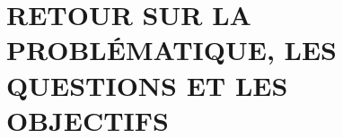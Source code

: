 
\label{chap:conclusion_generale}

\section{RETOUR SUR LA PROBL\'EMATIQUE, LES QUESTIONS ET LES OBJECTIFS}
\label{sec:cg_questions}
